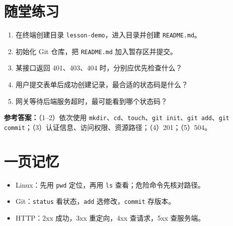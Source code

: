 \documentclass[11pt,a4paper]{ctexart}
\begin{document}
\section{随堂练习}

\begin{enumerate}
  \item 在终端创建目录 \texttt{lesson-demo}，进入目录并创建 \texttt{README.md}。
  \item 初始化 Git 仓库，把 \texttt{README.md} 加入暂存区并提交。
  \item 某接口返回 401、403、404 时，分别应优先检查什么？
  \item 用户提交表单后成功创建记录，最合适的状态码是什么？
  \item 网关等待后端服务超时，最可能看到哪个状态码？
\end{enumerate}

\textbf{参考答案：}（1--2）依次使用 \texttt{mkdir}、\texttt{cd}、\texttt{touch}、\texttt{git init}、\texttt{git add}、\texttt{git commit}；（3）认证信息、访问权限、资源路径；（4）201；（5）504。

\section*{一页记忆}

\begin{itemize}
  \item Linux：先用 \texttt{pwd} 定位，再用 \texttt{ls} 查看；危险命令先核对路径。
  \item Git：\texttt{status} 看状态，\texttt{add} 选修改，\texttt{commit} 存版本。
  \item HTTP：2xx 成功，3xx 重定向，4xx 查请求，5xx 查服务端。
\end{itemize}
\end{document}
